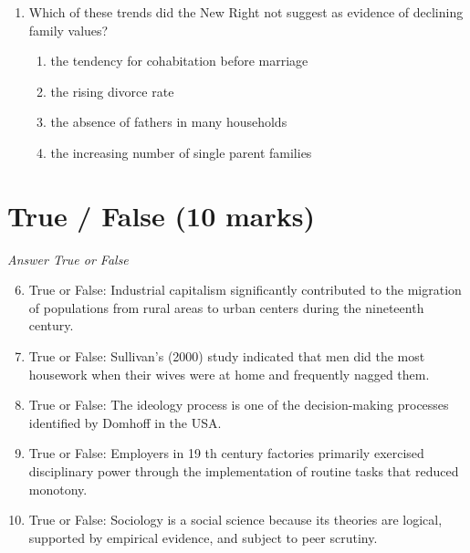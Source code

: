 \documentclass[12pt]{article}
\begin{document}
\begin{enumerate}[label=\arabic*.]
\begin{enumerate}[label=(\alph*)]
    \item formed an inferior 'race' with low levels of intelligence
    \item lived morally unsound lives of crime and squalor
    \item were too reliant upon welfare benefits
    \item all of the above
\end{enumerate}
\item Which of these trends did the New Right not suggest as evidence of declining family values?
\begin{enumerate}[label=(\alph*)]
    \item the tendency for cohabitation before marriage
    \item the rising divorce rate
    \item the absence of fathers in many households
    \item the increasing number of single parent families
\end{enumerate}
\end{enumerate}

\section*{True / False (10 marks)}
\textit{Answer True or False}
\begin{enumerate}[label=\arabic*.]
\setcounter{enumi}{5}
\item True or False: Industrial capitalism significantly contributed to the migration of populations from rural areas to urban centers during the nineteenth century.
\item True or False: Sullivan's (2000) study indicated that men did the most housework when their wives were at home and frequently nagged them.
\item True or False: The ideology process is one of the decision-making processes identified by Domhoff in the USA.
\item True or False: Employers in 19 th century factories primarily exercised disciplinary power through the implementation of routine tasks that reduced monotony.
\item True or False: Sociology is a social science because its theories are logical, supported by empirical evidence, and subject to peer scrutiny.
\end{enumerate}
\end{document}
